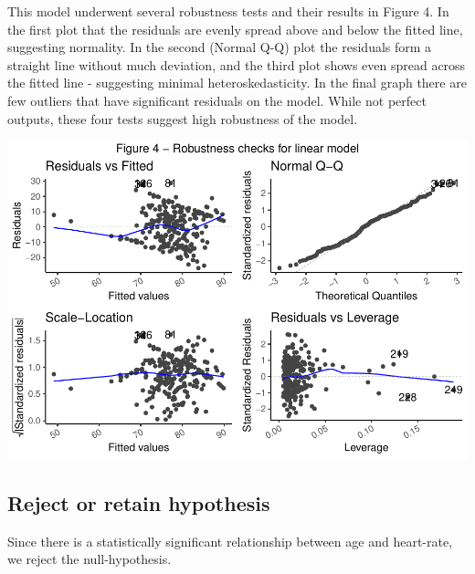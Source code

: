 \documentclass[preprint, 3p,
authoryear]{elsarticle} %
\begin{document}
This model underwent several robustness tests and their results in
Figure 4. In the first plot that the residuals are evenly spread above
and below the fitted line, suggesting normality. In the second (Normal
Q-Q) plot the residuals form a straight line without much deviation, and
the third plot shows even spread across the fitted line - suggesting
minimal heteroskedasticity. In the final graph there are few outliers
that have significant residuals on the model. While not perfect outputs,
these four tests suggest high robustness of the model.

\includegraphics{assignment_2_files/figure-latex/unnamed-chunk-12-1.pdf}

\hypertarget{reject-or-retain-hypothesis-3}{%
\subsection{Reject or retain
hypothesis}\label{reject-or-retain-hypothesis-3}}

Since there is a statistically significant relationship between age and
heart-rate, we reject the null-hypothesis.
\end{document}
